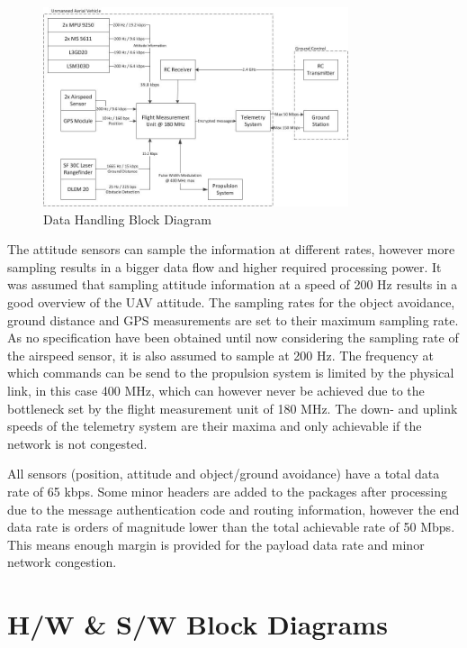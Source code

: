 \begin{figure}[ht]
    \centering
    \includegraphics[width=0.8\textwidth]{./CommandDataHandling/Figures/DataDiagram.jpg}
    \caption{Data Handling Block Diagram}
    \label{fig:data_hand_bloc_diag}
\end{figure}

The attitude sensors can sample the information at different rates, however more sampling results in a bigger data flow and higher required processing power. It was assumed that sampling attitude information at a speed of 200 Hz results in a good overview of the UAV attitude. The sampling rates for the object avoidance, ground distance and GPS measurements are set to their maximum sampling rate. As no specification have been obtained until now considering the sampling rate of the airspeed sensor, it is also assumed to sample at 200 Hz. The frequency at which commands can be send to the propulsion system is limited by the physical link, in this case 400 MHz, which can however never be achieved due to the bottleneck set by the flight measurement unit of 180 MHz. The down- and uplink speeds of the telemetry system are their maxima and only achievable if the network is not congested. 

All sensors (position, attitude and object/ground avoidance) have a total data rate of 65 kbps. Some minor headers are added to the packages after processing due to the message authentication code and routing information, however the end data rate is orders of magnitude lower than the total achievable rate of 50 Mbps. This means enough margin is provided for the payload data rate and minor network congestion.   


\section{H/W \& S/W Block Diagrams}
\label{sec:hw_sw_bloc_diag}

